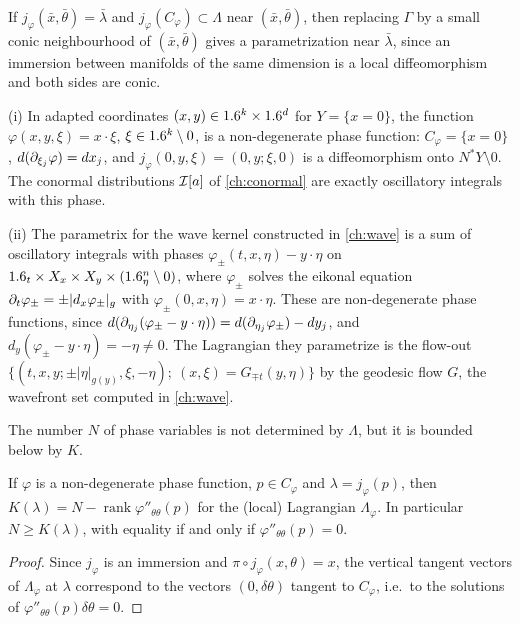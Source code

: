 If $j_\varphi(\bar x,\bar\theta)=\bar\lambda$ and $j_\varphi(C_\varphi)\subset
\Lambda$ near $(\bar x,\bar\theta)$, then replacing $\Gamma$ by a small conic
neighbourhood of $(\bar x,\bar\theta)$ gives a parametrization near
$\bar\lambda$, since an immersion between manifolds of the same dimension is a
local diffeomorphism and both sides are conic.

\begin{example}\label{hj:ex:phases}
  (i) In adapted coordinates $(x,y)\in1.6^k\times1.6^d$ for $Y=\{x=0\}$, the
  function $\varphi(x,y,\xi)=x\cdot\xi$, $\xi\in1.6^k\setminus0$, is a
  non-degenerate phase function: $C_\varphi=\{x=0\}$,
  $d(\partial_{\xi_j}\varphi)=dx_j$, and $j_\varphi(0,y,\xi)=(0,y;\xi,0)$ is a
  diffeomorphism onto $N^*Y\setminus0$.  The conormal distributions
  $\mathcal{I}[a]$ of \cref{ch:conormal} are exactly oscillatory integrals with this
  phase.

  (ii) The parametrix for the wave kernel constructed in \cref{ch:wave} is a
  sum of oscillatory integrals with phases
  $\varphi_\pm(t,x,\eta)-y\cdot\eta$ on $1.6_t\times X_x\times X_y\times
  (1.6^n_\eta\setminus0)$, where $\varphi_\pm$ solves the eikonal equation
  $\partial_t\varphi_\pm=\pm|d_x\varphi_\pm|_g$ with $\varphi_\pm(0,x,\eta)=x\cdot\eta$.
  These are non-degenerate phase functions, since
  $d(\partial_{\eta_j}(\varphi_\pm-y\cdot\eta))=d(\partial_{\eta_j}\varphi_\pm)-dy_j$, and
  $d_y(\varphi_\pm-y\cdot\eta)=-\eta\ne0$.  The Lagrangian they parametrize
  is the flow-out $\{(t,x,y;\pm|\eta|_{g(y)},\xi,-\eta);\
  (x,\xi)=G_{\mp t}(y,\eta)\}$ by the geodesic flow $G$, the wavefront set
  computed in \cref{ch:wave}.
\end{example}

The number $N$ of phase variables is not determined by $\Lambda$, but it is
bounded below by $K$.

\begin{lemma}\label{hj:lem:rank}
  If $\varphi$ is a non-degenerate phase function, $p\in C_\varphi$ and
  $\lambda=j_\varphi(p)$, then $K(\lambda)=N-\operatorname{rank}
  \varphi''_{\theta\theta}(p)$ for the (local) Lagrangian $\Lambda_\varphi$.  In
  particular $N\ge K(\lambda)$, with equality if and only if
  $\varphi''_{\theta\theta}(p)=0$.
\end{lemma}
\begin{proof}
  Since $j_\varphi$ is an immersion and $\pi\circ j_\varphi(x,\theta)=x$, the
  vertical tangent vectors of $\Lambda_\varphi$ at $\lambda$ correspond to the
  vectors $(0,\delta\theta)$ tangent to $C_\varphi$, i.e.\ to the solutions of
  $\varphi''_{\theta\theta}(p)\delta\theta=0$.
\end{proof}


